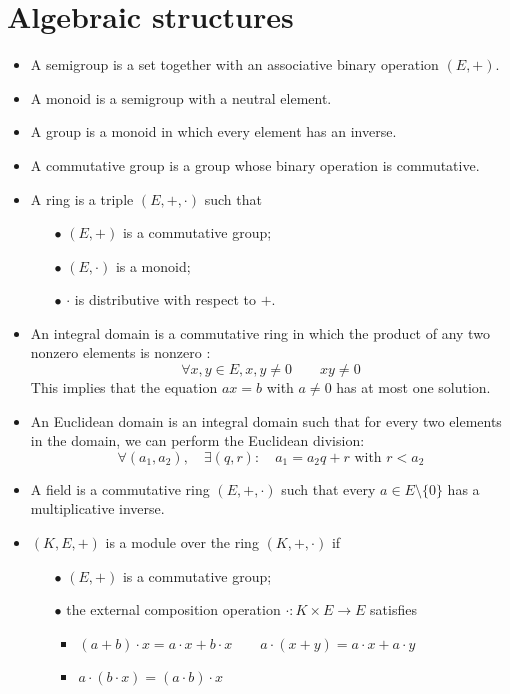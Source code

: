\documentclass[12pt, openany]{report}
\theoremstyle{definition}
\begin{document}
\section{Algebraic structures}
\begin{itemize}
    \item A semigroup is a set together with an associative binary operation \((E,+)\).
    \item A monoid is a semigroup with a neutral element.
    \item A group is a monoid in which every element has an inverse.
    \item A commutative group is a group whose binary operation is commutative.
    \item A ring is a triple \((E,+,\cdot)\) such that
    \begin{itemize}
        \item [\(\bullet\)] \((E,+)\) is a commutative group;
        \item [\(\bullet\)] \((E,\cdot)\) is a monoid;
        \item [\(\bullet\)] $\cdot$ is distributive with respect to \(+\).
    \end{itemize}
    \item An integral domain is a commutative ring in which the product of any two nonzero elements is nonzero : \[\forall x,y\in E, x,y\neq 0\qquad xy\neq 0\] This implies that the equation \(ax=b\) with \(a\neq 0\) has at most one solution. 
    \item An Euclidean domain is an integral domain such that for every two elements in the domain, we can perform the Euclidean division: \[\forall (a_1,a_2), \quad \exists (q,r) : \quad a_1=a_2q+r \text{ with }r<a_2\]
    \item A field is a commutative ring \((E,+,\cdot)\) such that every \(a\in E\setminus \{0\}\) has a multiplicative inverse.
    \item \((K,E,+)\) is a module over the ring \((K,+,\cdot)\) if 
    \begin{itemize}
        \item [\(\bullet\)] \((E,+)\) is a commutative group;
        \item [\(\bullet\)] the external composition operation \(\cdot:K\times E\rightarrow E\) satisfies 
        \begin{itemize}
            \item \((a+b)\cdot x = a\cdot x+b \cdot x \qquad a\cdot (x+y) = a\cdot x+a\cdot y\)
            \item \(a\cdot (b\cdot x) = (a\cdot b)\cdot x\)

\end{itemize}
\end{itemize}
\end{itemize}
\end{document}
